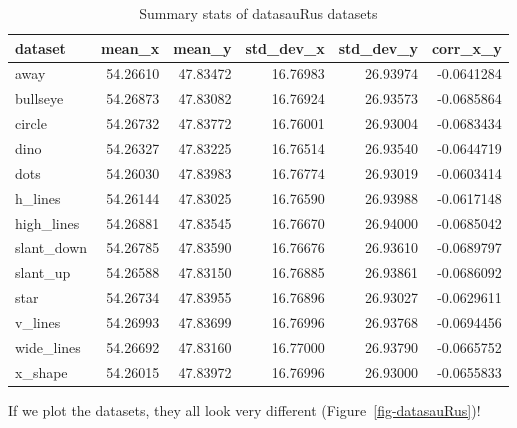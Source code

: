 \documentclass[
  letterpaper,
  DIV=11,
  numbers=noendperiod]{scrartcl}
\begin{document}
\hypertarget{tbl-datasauRus}{}
\begin{table}
\caption{\label{tbl-datasauRus}Summary stats of datasauRus datasets }\tabularnewline

\centering\begingroup\fontsize{20}{22}\selectfont

\begin{tabular}{l|r|r|r|r|r}
\hline
dataset & mean\_x & mean\_y & std\_dev\_x & std\_dev\_y & corr\_x\_y\\
\hline
away & 54.26610 & 47.83472 & 16.76983 & 26.93974 & -0.0641284\\
\hline
bullseye & 54.26873 & 47.83082 & 16.76924 & 26.93573 & -0.0685864\\
\hline
circle & 54.26732 & 47.83772 & 16.76001 & 26.93004 & -0.0683434\\
\hline
dino & 54.26327 & 47.83225 & 16.76514 & 26.93540 & -0.0644719\\
\hline
dots & 54.26030 & 47.83983 & 16.76774 & 26.93019 & -0.0603414\\
\hline
h\_lines & 54.26144 & 47.83025 & 16.76590 & 26.93988 & -0.0617148\\
\hline
high\_lines & 54.26881 & 47.83545 & 16.76670 & 26.94000 & -0.0685042\\
\hline
slant\_down & 54.26785 & 47.83590 & 16.76676 & 26.93610 & -0.0689797\\
\hline
slant\_up & 54.26588 & 47.83150 & 16.76885 & 26.93861 & -0.0686092\\
\hline
star & 54.26734 & 47.83955 & 16.76896 & 26.93027 & -0.0629611\\
\hline
v\_lines & 54.26993 & 47.83699 & 16.76996 & 26.93768 & -0.0694456\\
\hline
wide\_lines & 54.26692 & 47.83160 & 16.77000 & 26.93790 & -0.0665752\\
\hline
x\_shape & 54.26015 & 47.83972 & 16.76996 & 26.93000 & -0.0655833\\
\hline
\end{tabular}
\endgroup{}
\end{table}

If we plot the datasets, they all look very different
(Figure~\ref{fig-datasauRus})!
\end{document}
